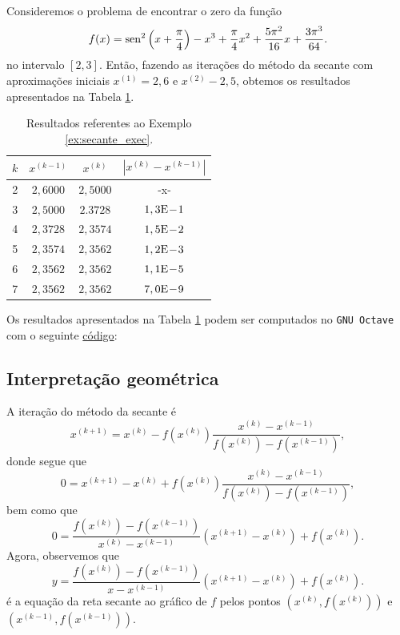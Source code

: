 \begin{ex}\label{ex:secante_exec}
  Consideremos o problema de encontrar o zero da função
  \begin{equation}
    f(x) = \operatorname{sen}^2\left(x+\frac{\pi}{4}\right) - x^3 + \frac{\pi}{4}x^2 + \frac{5\pi^2}{16}x + \frac{3\pi^3}{64}.
  \end{equation}
  no intervalo $[2,3]$. Então, fazendo as iterações do método da secante com aproximações iniciais $x^{(1)}=2,6$ e $x^{(2)}-2,5$, obtemos os resultados apresentados na Tabela \ref{tab:ex_secante_exec}.

\begin{table}[h!]
  \centering
  \caption{Resultados referentes ao Exemplo \ref{ex:secante_exec}.}
  \label{tab:ex_secante_exec}
  \begin{tabular}{r|ccc}
    $k$ & $x^{(k-1)}$ & $x^{(k)}$ & $|x^{(k)}-x^{(k-1)}|$ \\\hline
    2 & $2,6000$ & $2,5000$ & -x-\\
    3 & $2,5000$ & $2.3728$ & $1,3\mathrm{E}\!-\!1$ \\
    4 & $2,3728$ & $2,3574$ & $1,5\mathrm{E}\!-\!2$ \\
    5 & $2,3574$ & $2,3562$ & $1,2\mathrm{E}\!-\!3$ \\
    6 & $2,3562$ & $2,3562$ & $1,1\mathrm{E}\!-\!5$ \\
    7 & $2,3562$ & $2,3562$ & $7,0\mathrm{E}\!-\!9$ \\\hline
  \end{tabular}
\end{table}

\ifisoctave
Os resultados apresentados na Tabela \ref{tab:ex_secante_exec} podem ser computados no \verb+GNU Octave+ com o seguinte \href{https://github.com/phkonzen/notas/blob/master/src/MatematicaNumerica/cap_eq1d/dados/ex_secante_exec/ex_secante_exec.m}{código}:

\fi
\end{ex}

\subsection{Interpretação geométrica}

A iteração do método da secante é
\begin{equation}
  x^{(k+1)} = x^{(k)} - f(x^{(k)})\frac{x^{(k)}-x^{(k-1)}}{f(x^{(k)})-f(x^{(k-1)})},
\end{equation}
donde segue que
\begin{equation}
  0 = x^{(k+1)}-x^{(k)} + f(x^{(k)})\frac{x^{(k)}-x^{(k-1)}}{f(x^{(k)})-f(x^{(k-1)})},
\end{equation}
bem como que
\begin{equation}\label{eq:secante_geointerp}
  0 = \frac{f(x^{(k)})-f(x^{(k-1)})}{x^{(k)}-x^{(k-1)}}(x^{(k+1)}-x^{(k)}) + f(x^{(k)}).
\end{equation}
Agora, observemos que
\begin{equation}
  y = \frac{f(x^{(k)})-f(x^{(k-1)})}{x-x^{(k-1)}}(x^{(k+1)}-x^{(k)}) + f(x^{(k)}).
\end{equation}
é a equação da reta secante ao gráfico de $f$ pelos pontos $(x^{(k)}, f(x^{(k)}))$ e $(x^{(k-1)}, f(x^{(k-1)}))$. 

